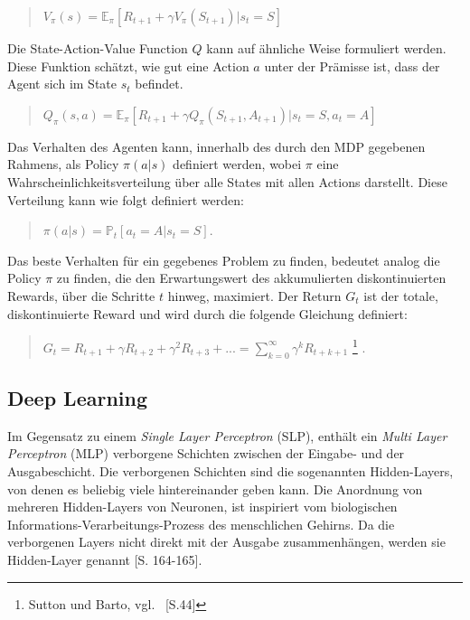 \begin{quotation}
\centering
   \( V_{\pi}(s) = \mathbb{E}_{\pi} [ R_{t+1} + \gamma V_{\pi}(S_{t+1}) | s_t = S ]  \) 
\end{quotation}


Die State-Action-Value Function $Q$ kann auf ähnliche Weise formuliert werden. Diese Funktion schätzt, wie gut eine Action $a$ unter der Prämisse ist, dass der Agent sich im State $ s_t $ befindet. 


\begin{quotation}
\centering
   \( Q_{\pi}(s,a) = \mathbb{E}_{\pi} [ R_{t+1} + \gamma Q_{\pi}(S_{t+1}, A_{t+1}) | s_t = S, a_t = A ]  \) 
   \label{eq:q_estimate}
\end{quotation}


Das Verhalten des Agenten kann, innerhalb des durch den MDP gegebenen Rahmens, als Policy $\pi(a|s)$ definiert werden, wobei $\pi $ eine Wahrscheinlichkeitsverteilung über alle States mit allen Actions darstellt. Diese Verteilung kann wie folgt definiert werden: 


\begin{quotation}
\centering
\( \pi(a|s) = \mathbb{P}_{t}[a_t = A | s_t = S] \label{eq:mdp_policy} \). %
\label{eq:mdp_policy}
\end{quotation}


Das beste Verhalten für ein gegebenes Problem  zu finden, bedeutet analog die Policy $\pi$ zu finden, die den Erwartungswert des akkumulierten diskontinuierten Rewards, über die Schritte $t$ hinweg, maximiert. Der Return $G_t$ ist der totale, diskontinuierte Reward und wird durch die folgende Gleichung definiert:

\begin{quotation}
\centering
   \( G_t = R_{t+1} + \gamma R_{t+2} + \gamma^{2} R_{t+3} + ... = \sum\limits_{k=0}^{\infty} \gamma^k R_{t+k+1} \) \footnote{Sutton und Barto, vgl. \cite{sutton2011reinforcement}~[S.44] } \label{eq:mdp_return}.
\end{quotation}





\subsection{Deep Learning}\label{absch_RL_deepL}
Im Gegensatz zu einem \emph{Single Layer Perceptron} (SLP), enthält ein \emph{Multi Layer Perceptron} (MLP) verborgene Schichten zwischen der Eingabe- und der Ausgabeschicht. Die verborgenen Schichten sind die sogenannten Hidden-Layers, von denen es beliebig viele hintereinander geben kann. Die Anordnung von mehreren Hidden-Layers von Neuronen, ist inspiriert vom biologischen Informations-Verarbeitungs-Prozess des menschlichen Gehirns. Da die verborgenen Layers nicht direkt mit der Ausgabe zusammenhängen, werden sie Hidden-Layer genannt \cite{Goodfellow-et-al-2016}[S. 164-165]. 

